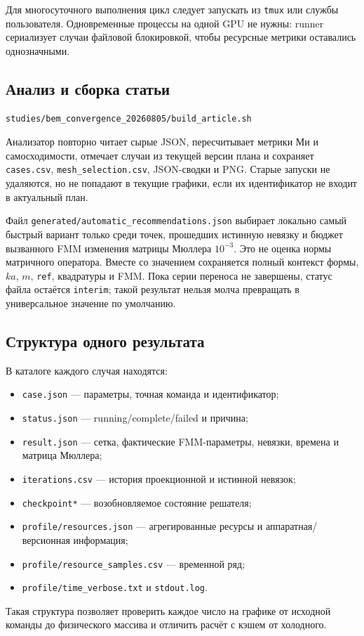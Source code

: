 \documentclass[12pt,a4paper]{article}
\begin{document}
Для многосуточного выполнения цикл следует запускать из \texttt{tmux} или
службы пользователя. Одновременные процессы на одной GPU не нужны: runner
сериализует случаи файловой блокировкой, чтобы ресурсные метрики оставались
однозначными.

\subsection{Анализ и сборка статьи}

\begin{lstlisting}[language=bash]
studies/bem_convergence_20260805/build_article.sh
\end{lstlisting}

Анализатор повторно читает сырые JSON, пересчитывает метрики Ми и
самосходимости, отмечает случаи из текущей версии плана и сохраняет
\texttt{cases.csv}, \texttt{mesh\_selection.csv}, JSON-сводки и PNG. Старые
запуски не удаляются, но не попадают в текущие графики, если их идентификатор
не входит в актуальный план.

Файл \texttt{generated/automatic\_recommendations.json} выбирает локально
самый быстрый вариант только среди точек, прошедших истинную невязку и бюджет
вызванного FMM изменения матрицы Мюллера $10^{-3}$. Это не оценка нормы
матричного оператора. Вместе со значением сохраняется полный контекст
формы, $ka$, $m$, \texttt{ref}, квадратуры и FMM. Пока серии переноса не
завершены, статус файла остаётся \texttt{interim}; такой результат нельзя
молча превращать в универсальное значение по умолчанию.

\subsection{Структура одного результата}

В каталоге каждого случая находятся:
\begin{itemize}
  \item \texttt{case.json} --- параметры, точная команда и идентификатор;
  \item \texttt{status.json} --- running/complete/failed и причина;
  \item \texttt{result.json} --- сетка, фактические FMM-параметры, невязки,
        времена и матрица Мюллера;
  \item \texttt{iterations.csv} --- история проекционной и истинной невязок;
  \item \texttt{checkpoint*} --- возобновляемое состояние решателя;
  \item \texttt{profile/resources.json} --- агрегированные ресурсы и
        аппаратная/версионная информация;
  \item \texttt{profile/resource\_samples.csv} --- временной ряд;
  \item \texttt{profile/time\_verbose.txt} и \texttt{stdout.log}.
\end{itemize}
Такая структура позволяет проверить каждое число на графике от исходной
команды до физического массива и отличить расчёт с кэшем от холодного.
\end{document}

